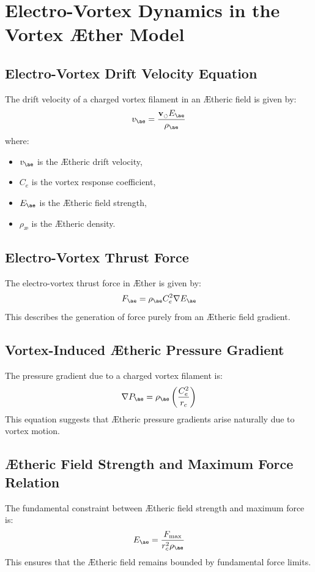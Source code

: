 \section{Electro-Vortex Dynamics in the Vortex Æther Model}

\subsection{Electro-Vortex Drift Velocity Equation}
The drift velocity of a charged vortex filament in an Ætheric field is given by:
\begin{equation}
    v_{\ae} = \frac{\mathbf{v}_{\scriptscriptstyle\boldsymbol{\circlearrowleft}} E_{\ae}}{\rho_\text{\ae}}
\end{equation}
where:
\begin{itemize}
    \item $v_{\ae}$ is the Ætheric drift velocity,
    \item $C_e$ is the vortex response coefficient,
    \item $E_{\ae}$ is the Ætheric field strength,
    \item $\rho_\text{\ae}$ is the Ætheric density.
\end{itemize}

\subsection{Electro-Vortex Thrust Force}
The electro-vortex thrust force in Æther is given by:
\begin{equation}
    F_{\ae} = \rho_\text{\ae} C_e^2 \nabla E_{\ae}
\end{equation}
This describes the generation of force purely from an Ætheric field gradient.

\subsection{Vortex-Induced Ætheric Pressure Gradient}
The pressure gradient due to a charged vortex filament is:
\begin{equation}
    \nabla P_{\ae} = \rho_\text{\ae} \left( \frac{C_e^2}{r_c} \right)
\end{equation}
This equation suggests that Ætheric pressure gradients arise naturally due to vortex motion.

\subsection{Ætheric Field Strength and Maximum Force Relation}
The fundamental constraint between Ætheric field strength and maximum force is:
\begin{equation}
    E_{\ae} = \frac{F_{\max}}{r_c^2 \rho_\text{\ae}}
\end{equation}
This ensures that the Ætheric field remains bounded by fundamental force limits.

